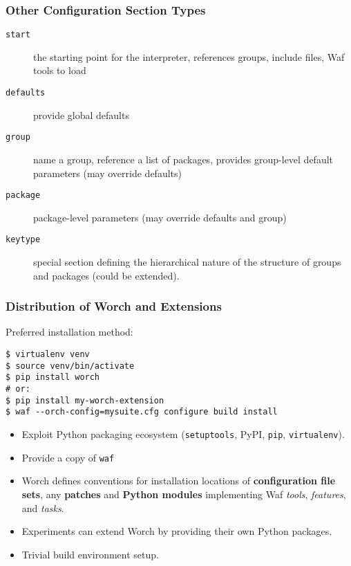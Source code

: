 \documentclass[xcolor=dvipsnames]{beamer}
\begin{document}
\begin{frame}
  \frametitle{Other Configuration Section Types}
  \begin{description}
  \item[\texttt{start}] the starting point for the interpreter, references
    groups, include files, Waf tools to load
  \item[\texttt{defaults}] provide global defaults
  \item[\texttt{group}] name a group, reference a list of packages, provides
    group-level default parameters (may override defaults)
  \item[\texttt{package}] package-level parameters (may override defaults and group)
  \item[\texttt{keytype}] special section defining the hierarchical nature of
    the structure of groups and packages (could be extended). 
  \end{description}
\end{frame}

\begin{frame}[fragile]
  \frametitle{Distribution of Worch and Extensions}

  Preferred installation method:
  \begin{verbatim}
$ virtualenv venv
$ source venv/bin/activate
$ pip install worch
# or:
$ pip install my-worch-extension
$ waf --orch-config=mysuite.cfg configure build install
  \end{verbatim}

  \footnotesize
  \begin{itemize}
  \item Exploit Python packaging ecosystem (\texttt{setuptools}, PyPI,
    \texttt{pip}, \texttt{virtualenv}).
  \item Provide a copy of \texttt{waf}
  \item Worch defines conventions for installation locations of
    \textbf{configuration file sets}, any \textbf{patches} and
    \textbf{Python modules} implementing Waf \textit{tools},
    \textit{features}, and \textit{tasks}.
  \item Experiments can extend Worch by providing their own Python
    packages.
  \item Trivial build environment setup.
  \end{itemize}

\end{frame}
\end{document}
